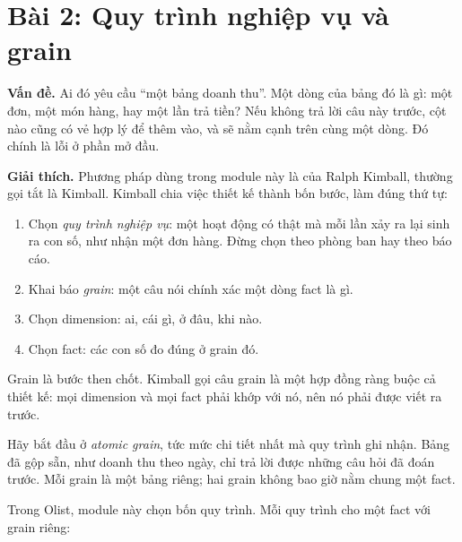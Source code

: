 \section{Bài 2: Quy trình nghiệp vụ và grain}

\textbf{Vấn đề.} Ai đó yêu cầu ``một bảng doanh thu''. Một dòng của bảng đó là gì: một đơn, một món hàng, hay một lần trả tiền? Nếu không trả lời câu này trước, cột nào cũng có vẻ hợp lý để thêm vào, và  sẽ nằm cạnh  trên cùng một dòng. Đó chính là lỗi ở phần mở đầu.

\textbf{Giải thích.} Phương pháp dùng trong module này là của Ralph Kimball, thường gọi tắt là Kimball. Kimball chia việc thiết kế thành bốn bước, làm đúng thứ tự:
\begin{enumerate}
  \item Chọn \textit{quy trình nghiệp vụ}: một hoạt động có thật mà mỗi lần xảy ra lại sinh ra con số, như nhận một đơn hàng. Đừng chọn theo phòng ban hay theo báo cáo.
  \item Khai báo \textit{grain}: một câu nói chính xác một dòng fact là gì.
  \item Chọn dimension: ai, cái gì, ở đâu, khi nào.
  \item Chọn fact: các con số đo đúng ở grain đó.
\end{enumerate}

Grain là bước then chốt. Kimball gọi câu grain là một hợp đồng ràng buộc cả thiết kế: mọi dimension và mọi fact phải khớp với nó, nên nó phải được viết ra trước.

Hãy bắt đầu ở \textit{atomic grain}, tức mức chi tiết nhất mà quy trình ghi nhận. Bảng đã gộp sẵn, như doanh thu theo ngày, chỉ trả lời được những câu hỏi đã đoán trước. Mỗi grain là một bảng riêng; hai grain không bao giờ nằm chung một fact.

Trong Olist, module này chọn bốn quy trình. Mỗi quy trình cho một fact với grain riêng:

